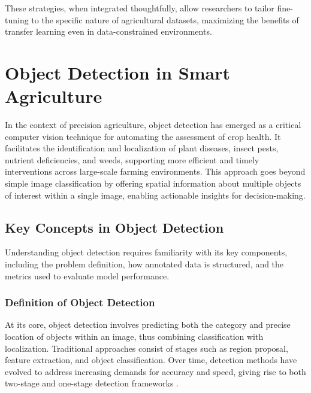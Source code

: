 These strategies, when integrated thoughtfully, allow researchers to tailor fine-tuning to the specific nature of agricultural datasets, maximizing the benefits of transfer learning even in data-constrained environments.


\section{Object Detection in Smart Agriculture}
In the context of precision agriculture, object detection has emerged as a critical computer vision technique for automating the assessment of crop health. It facilitates the identification and localization of plant diseases, insect pests, nutrient deficiencies, and weeds, supporting more efficient and timely interventions across large-scale farming environments. 
This approach goes beyond simple image classification by offering spatial information about multiple objects of interest within a single image, enabling actionable insights for decision-making.

\subsection{Key Concepts in Object Detection}
Understanding object detection requires familiarity with its key components, including the problem definition, how annotated data is structured, and the metrics used to evaluate model performance. 
\subsubsection{Definition of Object Detection}
At its core, object detection involves predicting both the category and precise location of objects within an image, thus combining classification with localization. Traditional approaches consist of stages such as region proposal, feature extraction, and object classification. Over time, detection methods have evolved to address increasing demands for accuracy and speed, giving rise to both two-stage and one-stage detection frameworks \parencite{zhao2019objectdetection}.

